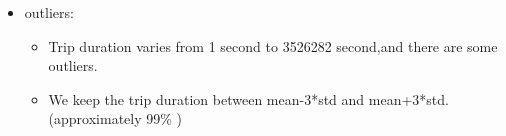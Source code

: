\documentclass[
 size=14pt,
 paper=smartboard,  %
 mode=present, 		%
 display=slides, 	%
 style=tuliplab,  	%
 pauseslide,
 fleqn,leqno]{powerdot}
\begin{document}
\begin{slide}[toc=,bm=]{}
  \begin{itemize}
  \item outliers:
  \begin{itemize}
    \item Trip duration varies from 1 second to 3526282 second,and there are some outliers. 
    \item We keep the trip duration between mean-3*std and mean+3*std.(approximately 99\% )
  \end{itemize}
\end{itemize}
\end{slide}









\end{document}
